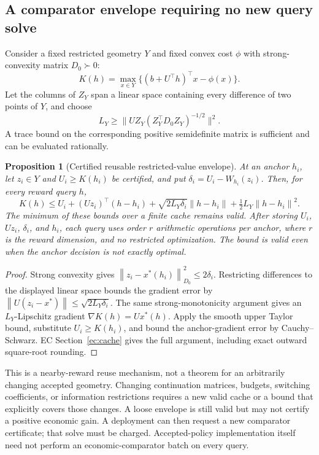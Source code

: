 \documentclass[11pt,letterpaper]{article}
\newtheorem{proposition}[theorem]{Proposition}
\theoremstyle{definition}\newtheorem{assumption}[theorem]{Assumption}
\newcommand{\norm}[1]{\left\lVert#1\right\rVert}
\begin{document}
\subsection{A comparator envelope requiring no new query solve}
Consider a fixed restricted geometry $Y$ and fixed convex cost $\phi$ with strong-convexity matrix $D_0\succ0$:
\[
 K(h)=\max_{x\in Y}\{(b+U^\top h)^\top x-\phi(x)\}.
\]
Let the columns of $Z_Y$ span a linear space containing every difference of two points of $Y$, and choose
\[
 L_Y\geq\bigl\|UZ_Y(Z_Y^\top D_0Z_Y)^{-1/2}\bigr\|^2.
\]
A trace bound on the corresponding positive semidefinite matrix is sufficient and can be evaluated rationally.
\begin{proposition}[Certified reusable restricted-value envelope]\label{prop:cache}
At an anchor $h_i$, let $z_i\in Y$ and $U_i\geq K(h_i)$ be certified, and put $\delta_i=U_i-W_{h_i}(z_i)$. Then, for every reward query $h$,
\begin{equation}\label{eq:cache}
 K(h)\leq U_i+(Uz_i)^\top(h-h_i)
 +\sqrt{2L_Y\delta_i}\norm{h-h_i}
 +\tfrac12L_Y\norm{h-h_i}^2.
\end{equation}
The minimum of these bounds over a finite cache remains valid. After storing $U_i$, $Uz_i$, $\delta_i$, and $h_i$, each query uses order $r$ arithmetic operations per anchor, where $r$ is the reward dimension, and no restricted optimization. The bound is valid even when the anchor decision is not exactly optimal.
\end{proposition}
\begin{proof}
Strong convexity gives $\norm{z_i-x^*(h_i)}_{D_0}^2\leq2\delta_i$. Restricting differences to the displayed linear space bounds the gradient error by $\norm{U(z_i-x^*)}\leq\sqrt{2L_Y\delta_i}$. The same strong-monotonicity argument gives an $L_Y$-Lipschitz gradient $\nabla K(h)=Ux^*(h)$. Apply the smooth upper Taylor bound, substitute $U_i\geq K(h_i)$, and bound the anchor-gradient error by Cauchy--Schwarz. EC Section~\ref{ec:cache} gives the full argument, including exact outward square-root rounding.\end{proof}

This is a nearby-reward reuse mechanism, not a theorem for an arbitrarily changing accepted geometry. Changing continuation matrices, budgets, switching coefficients, or information restrictions requires a new valid cache or a bound that explicitly covers those changes. A loose envelope is still valid but may not certify a positive economic gain. A deployment can then request a new comparator certificate; that solve must be charged. Accepted-policy implementation itself need not perform an economic-comparator batch on every query.
\end{document}
